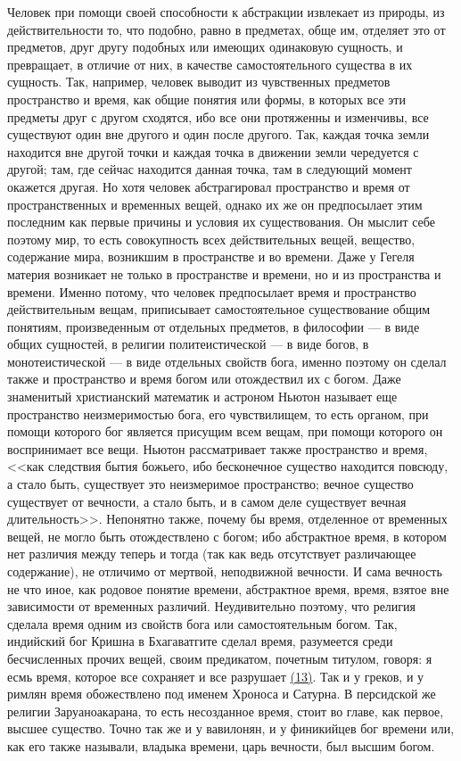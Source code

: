 \documentclass[12pt]{article}
\begin{document}
Человек при помощи своей способности к абстракции извлекает из природы, из действительности то, что подобно, равно в предметах, обще им, отделяет это от предметов, друг другу подобных или имеющих одинаковую сущность, и превращает, в отличие от них, в качестве самостоятельного существа в их сущность. Так, например, человек выводит из чувственных предметов пространство и время, как общие понятия или формы, в которых все эти предметы друг с другом сходятся, ибо все они протяженны и изменчивы, все существуют один вне другого и один после другого. Так, каждая точка земли находится вне другой точки и каждая точка в движении земли чередуется с другой; там, где сейчас находится данная точка, там в следующий момент окажется другая. Но хотя человек абстрагировал пространство и время от пространственных и временных вещей, однако их же он предпосылает этим последним как первые причины и условия их существования. Он мыслит себе поэтому мир, то есть совокупность всех действительных вещей, вещество, содержание мира, возникшим в пространстве и во времени. Даже у Гегеля материя возникает не только в пространстве и времени, но и из пространства и времени. Именно потому, что человек предпосылает время и пространство действительным вещам, приписывает самостоятельное существование общим понятиям, произведенным от отдельных предметов, в философии --- в виде общих сущностей, в религии политеистической --- в виде богов, в монотеистической --- в виде отдельных свойств бога, именно поэтому он сделал также и пространство и время богом или отождествил их с богом. Даже знаменитый христианский математик и астроном Ньютон называет еще пространство неизмеримостью бога, его чувствилищем, то есть органом, при помощи которого бог является присущим всем вещам, при помощи которого он воспринимает все вещи. Ньютон рассматривает также пространство и время, <<как следствия бытия божьего, ибо бесконечное существо находится повсюду, а стало быть, существует это неизмеримое пространство; вечное существо существует от вечности, а стало быть, и в самом деле существует вечная длительность>>. Непонятно также, почему бы время, отделенное от временных вещей, не могло быть отождествлено с богом; ибо абстрактное время, в котором нет различия между теперь и тогда (так как ведь отсутствует различающее содержание), не отличимо от мертвой, неподвижной вечности. И сама вечность не что иное, как родовое понятие времени, абстрактное время, время, взятое вне зависимости от временных различий. Неудивительно поэтому, что религия сделала время одним из свойств бога или самостоятельным богом. Так, индийский бог Кришна в Бхагаватгите сделал время, разумеется среди бесчисленных прочих вещей, своим предикатом, почетным титулом, говоря: я есмь время, которое все сохраняет и все разрушает \hyperlink{13}{(13)}\hypertarget{b13}{}. Так и у греков, и у римлян время обожествлено под именем Хроноса и Сатурна. В персидской же религии Заруаноакарана, то есть несозданное время, стоит во главе, как первое, высшее существо. Точно так же и у вавилонян, и у финикийцев бог времени или, как его также называли, владыка времени, царь вечности, был высшим богом. 
\end{document}
